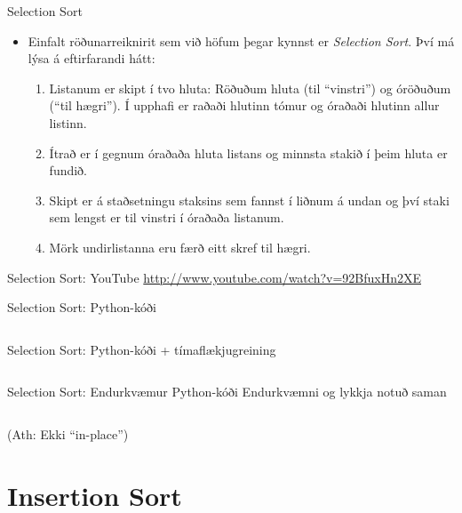 \documentclass[handout]{beamer}
\begin{document}
\begin{frame}{Selection Sort}
\begin{itemize}
 \item Einfalt röðunarreiknirit sem við höfum þegar kynnst er \emph{Selection Sort}. Því má lýsa á eftirfarandi hátt:
 \begin{enumerate}
  \item Listanum er skipt í tvo hluta: Röðuðum hluta (til ``vinstri'') og óröðuðum (``til hægri''). Í upphafi er raðaði hlutinn tómur og óraðaði hlutinn allur listinn.
  \item Ítrað er í gegnum óraðaða hluta listans og minnsta stakið í þeim hluta er fundið.
  \item Skipt er á staðsetningu staksins sem fannst í liðnum á undan og því staki sem lengst er til vinstri í óraðaða listanum.
  \item Mörk undirlistanna eru færð eitt skref til hægri.
 \end{enumerate}
\end{itemize}
\end{frame}

\begin{frame}{Selection Sort: YouTube}
\url{http://www.youtube.com/watch?v=92BfuxHn2XE}
\end{frame}

\begin{frame}[fragile]{Selection Sort: Python-kóði}
\inputminted[linenos]{python}{Code/Python/selection_sort.py}
\end{frame}

\begin{frame}[fragile]{Selection Sort: Python-kóði + tímaflækjugreining}
\inputminted[linenos]{python}{Code/Python/selection_sort_complexity.py}
\end{frame}

\begin{frame}[fragile]{Selection Sort: Endurkvæmur Python-kóði}
Endurkvæmni og lykkja notuð saman
\inputminted[linenos]{python}{Code/Python/selection_sort_recursive.py}
(Ath: Ekki ``in-place'')
\end{frame}

\section{Insertion Sort}
\end{document}
